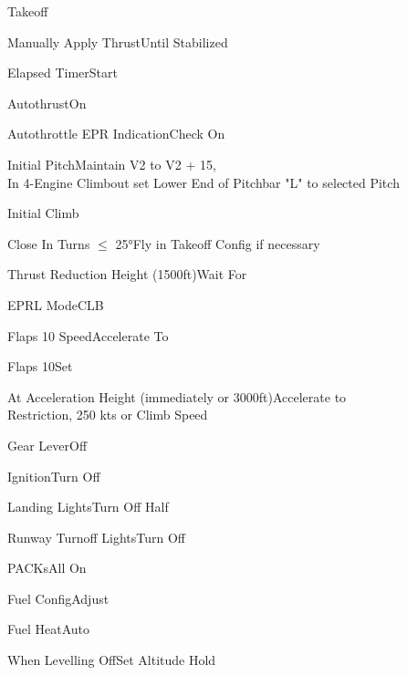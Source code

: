 \documentclass[sim-use, blue_items]{checklist}
\begin{document}
\begin{checklist}{Takeoff}
	\item{Manually Apply Thrust}{Until Stabilized}
	\item{Elapsed Timer}{Start}
	\item{Autothrust}{On}
	\item{Autothrottle EPR Indication}{Check On}
	\item{Initial Pitch}{Maintain V2 to V2 + 15,\\In 4-Engine Climbout set Lower End of Pitchbar "L" to selected Pitch}
\end{checklist}

\begin{checklist}{Initial Climb}
	\item{Close In Turns $\leq$ 25°}{Fly in Takeoff Config if necessary}
	\item{Thrust Reduction Height (1500ft)}{Wait For}
	\item{EPRL Mode}{CLB}
	 {
		\item{Flaps 10 Speed}{Accelerate To}
		\item{Flaps 10}{Set}
	}
	\item{At Acceleration Height (immediately or 3000ft)}{Accelerate to\\Restriction, 250 kts or Climb Speed}
	 {
		\item{Gear Lever}{Off}
		\item{Ignition}{Turn Off}
		\item{Landing Lights}{Turn Off Half}
		\item{Runway Turnoff Lights}{Turn Off}
		\item{PACKs}{All On}
		\item{Fuel Config}{Adjust}
		\item{Fuel Heat}{Auto}
	}
	\item{When Levelling Off}{Set Altitude Hold}
\end{checklist}
\end{document}
